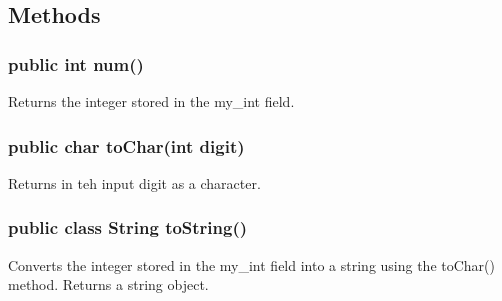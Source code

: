 \begin{homeworkProblem}
    \subsection{Methods}
    \subsubsection{public int num()}
    Returns the integer stored in the my\_int field.
    \subsubsection{public char toChar(int digit)}
    Returns in teh input digit as a character.
    \subsubsection{public class String toString()}
    Converts the integer stored in the my\_int field into a string using the toChar() method. Returns a string object.
\end{homeworkProblem}
